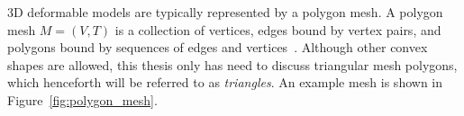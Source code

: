       


3D deformable models are typically represented by a polygon mesh. A polygon mesh $M = (V, T)$ is a collection of vertices, edges bound by vertex pairs, and polygons bound by sequences of edges and vertices~\cite{smith2006vertex}. Although other convex shapes are allowed, this thesis only has need to discuss triangular mesh polygons, which henceforth will be referred to as \emph{triangles}. An example mesh is shown in Figure~\ref{fig:polygon_mesh}. 

